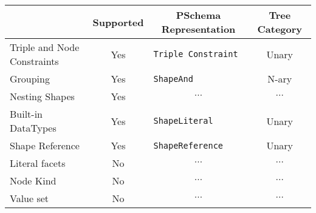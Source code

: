 \begin{table}[ht]
    \centering
    \begin{tabular}{|l|c|l|c|}
        \hline
        \rowcolor[HTML]{C0C0C0}
        \multicolumn{1}{|c|}{\cellcolor[HTML]{C0C0C0}\textbf{Feature}} & \textbf{Supported}         & \multicolumn{1}{c|}{\cellcolor[HTML]{C0C0C0}\textbf{PSchema Representation}} & \multicolumn{1}{c|}{\cellcolor[HTML]{C0C0C0}\textbf{Tree Category}} \\ \hline
        Triple and Node Constraints                                    & {\color[HTML]{009901} Yes} & \texttt{Triple Constraint}                                                   & Unary                                                               \\ \hline
        Grouping                                                       & {\color[HTML]{009901} Yes} & \texttt{ShapeAnd}                                                            & N-ary                                                               \\ \hline
        Nesting Shapes                                                 & {\color[HTML]{009901} Yes} & \multicolumn{1}{c|}{$\cdots$}                                                & \multicolumn{1}{c|}{$\cdots$}                                       \\ \hline
        Built-in DataTypes                                             & {\color[HTML]{009901} Yes} & \texttt{ShapeLiteral}                                                        & Unary                                                               \\ \hline
        Shape Reference                                                & {\color[HTML]{009901} Yes} & \texttt{ShapeReference}                                                      & Unary                                                               \\ \hline
        Literal facets                                                 & {\color[HTML]{FE0000} No}  & \multicolumn{1}{c|}{$\cdots$}                                                & \multicolumn{1}{c|}{$\cdots$}                                       \\ \hline
        Node Kind                                                      & {\color[HTML]{FE0000} No}  & \multicolumn{1}{c|}{$\cdots$}                                                & \multicolumn{1}{c|}{$\cdots$}                                       \\ \hline
        Value set                                                      & {\color[HTML]{FE0000} No}  & \multicolumn{1}{c|}{$\cdots$}                                                & \multicolumn{1}{c|}{$\cdots$}                                       \\ \hline

\end{tabular}
\end{table}
